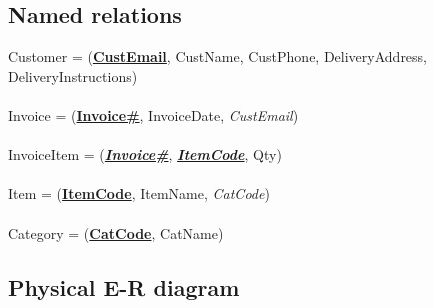 \subsection{Named relations}

Customer = (\textbf{\underline{CustEmail}}, CustName, CustPhone, DeliveryAddress, DeliveryInstructions)
\\\\
Invoice = (\textbf{\underline{Invoice\#}}, InvoiceDate, \emph{CustEmail})
\\\\
InvoiceItem = (\textbf{\underline{\emph{Invoice\#}}}, \textbf{\underline{\emph{ItemCode}}}, Qty)
\\\\
Item = (\textbf{\underline{ItemCode}}, ItemName, \emph{CatCode})
\\\\
Category = (\textbf{\underline{CatCode}}, CatName)

\subsection{Physical E-R diagram}